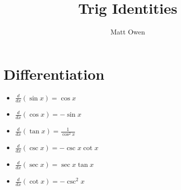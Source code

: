 \documentclass[11pt,twoside,a4paper]{article}
\title{Trig Identities}
\author{Matt Owen}
\begin{document}
\maketitle
\tableofcontents
\cleardoublepage

\section{Differentiation}

\begin{itemize}
  \item $ \frac{d}{dx}(\sin x) = \cos x$
  \item $ \frac{d}{dx}(\cos x) = -\sin x$
  \item $ \frac{d}{dx}(\tan x) = \frac{1}{\cos^2 x}$
  \item $ \frac{d}{dx}(\csc x) = -\csc x \cot x$
  \item $ \frac{d}{dx}(\sec x) = \sec x \tan x$
  \item $ \frac{d}{dx}(\cot x) = -\csc^2 x$
\end{itemize}
\end{document}
